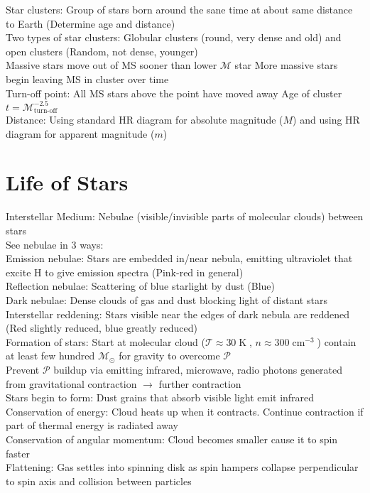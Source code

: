 \documentclass{article}
\DeclareMathOperator{\cm}{cm}
\DeclareMathOperator{\K}{K}
\begin{document}
Star clusters: Group of stars born around the sane time at about same distance to Earth (Determine age and distance)\\
Two types of star clusters: Globular clusters (round, very dense and old) and open clusters (Random, not dense, younger)\\
Massive stars move out of MS sooner than lower $\mathcal{M}$ star \qquad More massive stars begin leaving MS in cluster over time\\
Turn-off point: All MS stars above the point have moved away \qquad Age of cluster $t=\mathcal{M}_{\text{turn-off}}^{-2.5}$\\
Distance: Using standard HR diagram for absolute magnitude ($M$) and using HR diagram for apparent magnitude ($m$)
\section{Life of Stars}
Interstellar Medium: Nebulae (visible/invisible parts of molecular clouds) between stars\\
See nebulae in 3 ways:\\
Emission nebulae: Stars are embedded in/near nebula, emitting ultraviolet that excite H to give emission spectra (Pink-red in general)\\
Reflection nebulae: Scattering of blue starlight by dust (Blue)\\
Dark nebulae: Dense clouds of gas and dust blocking light of distant stars\\
Interstellar reddening: Stars visible near the edges of dark nebula are reddened (Red slightly reduced, blue greatly reduced)\\
Formation of stars: Start at molecular cloud ($\mathcal{T}\approx 30\K$, $n\approx 300\cm^{-3}$) contain at least few hundred $\mathcal{M}_{\odot}$ for gravity to overcome $\mathcal{P}$\\
Prevent $\mathcal{P}$ buildup via emitting infrared, microwave, radio photons generated from gravitational contraction $\rightarrow$ further contraction\\
Stars begin to form: Dust grains that absorb visible light emit infrared\\
Conservation of energy: Cloud heats up when it contracts. Continue contraction if part of thermal energy is radiated away\\
Conservation of angular momentum: Cloud becomes smaller cause it to spin faster\\
Flattening: Gas settles into spinning disk as spin hampers collapse perpendicular to spin axis and collision between particles\\
\end{document}
